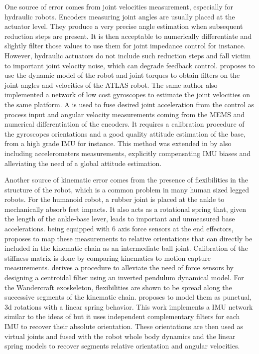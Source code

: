 One source of error comes from joint velocities measurement, especially for hydraulic robots. Encoders measuring joint angles are usually placed 
at the actuator level. They produce a very precise angle estimation when subsequent reduction steps are present. It is then acceptable to numerically 
differentiate and slightly filter those values to use them for joint impedance control for instance. However, hydraulic
actuators do not include such reduction steps and fall victim to important joint velocity noise, which can degrade feedback control.
\cite{xinjilefu2014decoupled} proposes to use the dynamic model of the robot and joint torques to obtain filters on the joint angles and velocities
of the ATLAS robot. The same author \cite{xinjilefu2016distributed} also implemented a network of low cost gyroscopes to estimate the joint velocities 
on the same platform. A \KalmanF is used to fuse desired joint acceleration from the control as process input and angular velocity measurements coming from 
the MEMS and numerical differentiation of the encoders. It requires a calibration procedure of the gyroscopes orientations and a good quality attitude
estimation of the base, from a high grade IMU for instance. This method was extended in \cite{rotella2016imu} by also including
accelerometers measurements, explicitly compensating IMU biases and alleviating the need of a global attitude estimation.

Another source of kinematic error comes from the presence of flexibilities in the structure of the robot, which is a common problem in many human sized legged robots. 
For the  humanoid robot, a rubber joint is placed at the ankle to mechanically absorb feet impacts. 
It also acts as a rotational spring that, given the length of the ankle-base lever, 
leads to important and unmeasured base accelerations.  being equipped with 6 axis 
force sensors at the end effectors, \cite{flayols2017experimental} proposes to map these measurements to relative orientations that can 
directly be included in the kinematic chain as an intermediate ball joint. Calibration of the stiffness matrix is done by comparing 
kinematics to motion capture measurements. \cite{benallegue2015estimation} derives a procedure to alleviate the need of force sensors by 
designing a centroidal filter using an inverted pendulum dynamical model. For the Wandercraft exoskeleton, flexibilities
are shown to be spread along the successive segments of the kinematic chain. \cite{vigne2018estimation} proposes to model them as punctual, 
3d rotations with a linear spring behavior. This work implements a IMU network similar to the ideas of \cite{xinjilefu2016distributed,rotella2016imu} 
but it uses independent complementary filters for each IMU to recover their absolute orientation. These orientations are then used as 
virtual joints and fused with the robot whole body dynamics and the linear spring models to recover segments relative orientation and angular velocities.


